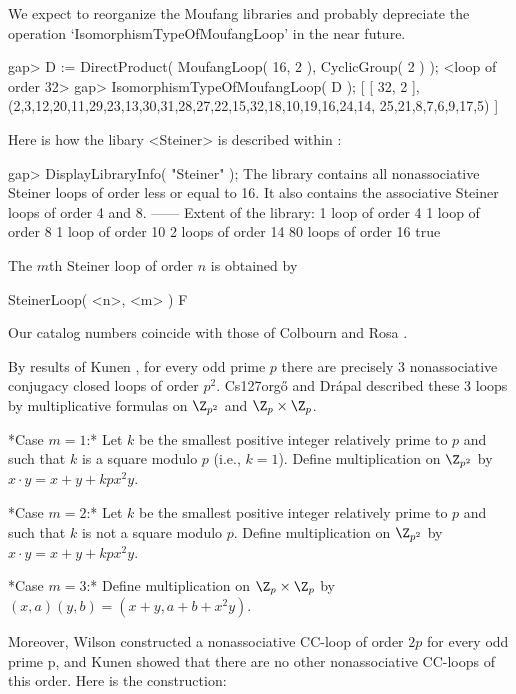 We expect to reorganize the Moufang libraries and probably depreciate the
operation `IsomorphismTypeOfMoufangLoop' in the near future.

\beginexample
gap> D := DirectProduct( MoufangLoop( 16, 2 ), CyclicGroup( 2 ) );
<loop of order 32>
gap> IsomorphismTypeOfMoufangLoop( D );
[ [ 32, 2 ], (2,3,12,20,11,29,23,13,30,31,28,27,22,15,32,18,10,19,16,24,14,
    25,21,8,7,6,9,17,5) ]
\endexample


Here is how the libary <Steiner> is described within {\LOOPS}:

\beginexample
gap> DisplayLibraryInfo( "Steiner" );
The library contains all nonassociative Steiner loops of order less or equal to 16.
It also contains the associative Steiner loops of order 4 and 8.
------
Extent of the library:
   1 loop of order 4
   1 loop of order 8
   1 loop of order 10
   2 loops of order 14
   80 loops of order 16
true
\endexample

The $m$th Steiner loop of order $n$ is obtained by

\>SteinerLoop( <n>, <m> ) F

Our catalog numbers coincide with those of Colbourn and Rosa \cite{CR}.


By results of Kunen \cite{Kunen}, for every odd prime $p$ there are
precisely 3 nonassociative conjugacy closed loops
of order $p^2$. Cs\accent127org\H{o} and Dr\'apal \cite{CD} described these 3 loops
by multiplicative formulas on $\Z_{p^2}$ and $\Z_p \times \Z_p$.

*Case $m = 1$:* Let $k$ be the smallest positive integer relatively prime to $p$
and such that $k$ is a square modulo $p$ (i.e., $k=1$). Define multiplication
on $\Z_{p^2}$ by $x\cdot y = x + y + kpx^2y$.

*Case $m = 2$:* Let $k$ be the smallest positive integer relatively prime to $p$
and such that $k$ is not a square modulo $p$. Define multiplication on
$\Z_{p^2}$ by $x\cdot y = x + y + kpx^2y$.

*Case $m = 3$:* Define multiplication on $\Z_p \times \Z_p$ by
$(x,a)(y,b) = (x+y, a+b+x^2y )$.

Moreover, Wilson \cite{Wilson} constructed a nonassociative CC-loop of order
$2p$ for every odd prime p, and Kunen \cite{Kunen} showed that there are no
other nonassociative CC-loops of this order. Here is the construction:

